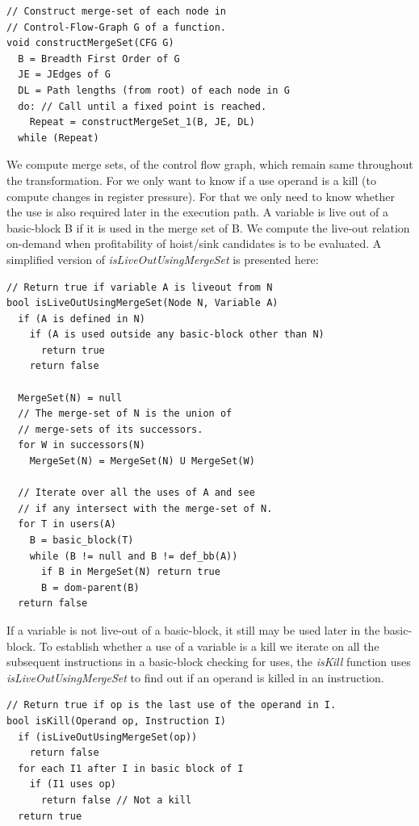\documentclass[sigplan,10pt,review,anonymous]{acmart}\settopmatter{printfolios=true,printccs=false,printacmref=false}
\begin{document}
\begin{verbatim}
// Construct merge-set of each node in
// Control-Flow-Graph G of a function.
void constructMergeSet(CFG G)
  B = Breadth First Order of G
  JE = JEdges of G
  DL = Path lengths (from root) of each node in G
  do: // Call until a fixed point is reached.
    Repeat = constructMergeSet_1(B, JE, DL)
  while (Repeat)
\end{verbatim}

We compute merge sets, of the control flow graph, which remain same throughout
the \GCM{} transformation. For \GCM{} we only want to know if a use operand is a
kill (to compute changes in register pressure). For that we only need to know
whether the use is also required later in the execution path. A variable is live
out of a basic-block B if it is used in the merge set of B. We compute the
live-out relation on-demand when profitability of hoist/sink candidates is to be
evaluated. A simplified version of \emph{isLiveOutUsingMergeSet} is presented
here:

\begin{verbatim}
// Return true if variable A is liveout from N
bool isLiveOutUsingMergeSet(Node N, Variable A)
  if (A is defined in N)
    if (A is used outside any basic-block other than N)
      return true
    return false

  MergeSet(N) = null
  // The merge-set of N is the union of
  // merge-sets of its successors.
  for W in successors(N)
    MergeSet(N) = MergeSet(N) U MergeSet(W)

  // Iterate over all the uses of A and see
  // if any intersect with the merge-set of N.
  for T in users(A)
    B = basic_block(T)
    while (B != null and B != def_bb(A))
      if B in MergeSet(N) return true
      B = dom-parent(B)
  return false
\end{verbatim}

If a variable is not live-out of a basic-block, it still may be used later in
the basic-block. To establish whether a use of a variable is a kill we iterate
on all the subsequent instructions in a basic-block checking for uses, the
\emph{isKill} function uses \emph{isLiveOutUsingMergeSet} to find out if an
operand is killed in an instruction.

\begin{verbatim}
// Return true if op is the last use of the operand in I.
bool isKill(Operand op, Instruction I)
  if (isLiveOutUsingMergeSet(op))
    return false
  for each I1 after I in basic block of I
    if (I1 uses op)
      return false // Not a kill
  return true
\end{verbatim}
\end{document}
